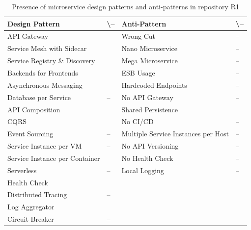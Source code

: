 \documentclass{Configuration_Files/PoliMi3i_thesis}
\newcommand{\cmark}{\ding{51}}%
\begin{document}
\begin{table}[H]
\centering 
    \begin{tabular}{ 
  | >{\centering\arraybackslash} m{16em} 
  | >{\centering\arraybackslash} m{2.2em} 
  | >{\centering\arraybackslash} m{16em} 
  | >{\centering\arraybackslash} m{2.2em} | }
    \hline
    \rowcolor{bluepoli!40}
    \textbf{Design Pattern} & \cmark \textbackslash – & \textbf{Anti-Pattern} & \cmark \textbackslash – \T\B \\
    \hline \hline
    API Gateway & \cmark & Wrong Cut & – \T\B\\
    \hline
    \rowcolor{bluepoli!10}
    Service Mesh with Sidecar & \cmark & Nano Microservice & – \T\B \\
    \hline
    Service Registry \& Discovery & \cmark & Mega Microservice & – \T\B \\
    \hline
    \rowcolor{bluepoli!10}
    Backends for Frontends & \cmark & ESB Usage & – \T\B \\
    \hline
    Asynchronous Messaging & \cmark & Hardcoded Endpoints & – \T\B \\
    \hline
    \rowcolor{bluepoli!10}
    Database per Service & – & No API Gateway & – \T\B \\
    \hline
    API Composition & \cmark & Shared Persistence & \cmark \T\B \\
    \hline
    \rowcolor{bluepoli!10}
    CQRS & \cmark & No CI/CD & – \T\B \\
    \hline
    Event Sourcing & – & Multiple Service Instances per Host & – \T\B \\
    \hline
    \rowcolor{bluepoli!10}
    Service Instance per VM & – & No API Versioning & – \T\B \\
    \hline
    Service Instance per Container & \cmark & No Health Check & – \T\B \\
    \hline
    \rowcolor{bluepoli!10}
    Serverless & – & Local Logging & – \T\B \\
    \hline
    Health Check & \cmark &  & \T\B \\
    \hline
    \rowcolor{bluepoli!10}
    Distributed Tracing & – & & \T\B \\
    \hline
    Log Aggregator & \cmark &  & \T\B \\
    \hline
    \rowcolor{bluepoli!10}
    Circuit Breaker & – &  & \T\B \\
    \hline
    \end{tabular}
    \\[10pt]
    \caption{Presence of microservice design patterns and anti-patterns in repository R1}
    \label{table:R1_result}
\end{table}
\end{document}
